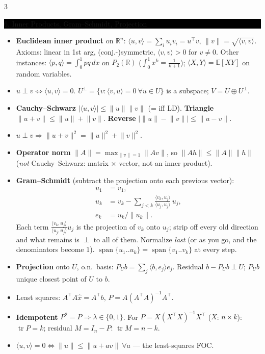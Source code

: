 \documentclass[8pt,letterpaper]{article}
\makeatletter
\newcommand{\sect}[1]{%
  \vspace{2.2pt}%
  \noindent\colorbox{black}{\parbox{\dimexpr\linewidth-2\fboxsep}{%
    \color{white}\bfseries\scshape\fontsize{6.4}{7.4}\selectfont
    \hyphenpenalty=10000\exhyphenpenalty=10000\raggedright #1}}%
  \vspace{1.4pt}\par\nopagebreak\@afterheading}
\newenvironment{tl}
  {\begin{itemize}[leftmargin=6pt,itemsep=0.3pt,topsep=1pt,parsep=0pt,
                   partopsep=0pt,label=\textcolor{gray}{\tiny$\bullet$}]}
  {\end{itemize}}
\newcommand{\R}{\mathbb{R}}
\newcommand{\Rn}{\mathbb{R}^n}
\newcommand{\E}{\mathbb{E}}
\newcommand{\tr}{\operatorname{tr}}
\newcommand{\spn}{\operatorname{span}}
\newcommand{\tp}{^{\!\top}}
\newcommand{\ip}[2]{\langle #1,#2\rangle}
\newcommand{\nm}[1]{\lVert #1\rVert}
\makeatother
\begin{document}
\begin{multicols}{3}
\sect{6. Inner Products, Gram--Schmidt, Projection}
\begin{tl}
\item \textbf{Euclidean inner product} on $\Rn$: $\ip{u}{v}=\sum_i u_iv_i=u\tp v$, $\nm{v}=\sqrt{\ip{v}{v}}$. Axioms: linear in 1st arg, (conj.-)symmetric, $\ip{v}{v}>0$ for $v\neq0$. Other instances: $\ip{p}{q}=\int_0^1pq\,dx$ on $P_2(\R)$ ($\int_0^1x^k=\frac1{k+1}$); $\ip{X}{Y}=\E[XY]$ on random variables.
\item $u\perp v\iff\ip{u}{v}=0$. $U^\perp=\{v:\ip{v}{u}=0\ \forall u\in U\}$ is a subspace; $V=U\oplus U^\perp$.
\item \textbf{Cauchy--Schwarz} $|\ip{u}{v}|\le\nm{u}\nm{v}$ (= iff LD). \textbf{Triangle} $\nm{u+v}\le\nm{u}+\nm{v}$. \textbf{Reverse} $\big|\nm{u}-\nm{v}\big|\le\nm{u-v}$.
\item $u\perp v\Rightarrow\nm{u+v}^2=\nm{u}^2+\nm{v}^2$.
\item \textbf{Operator norm} $\nm{A}=\max_{\nm{v}=1}\nm{Av}$, so $\nm{Ah}\le\nm{A}\nm{h}$ (\emph{not} Cauchy--Schwarz: matrix $\times$ vector, not an inner product).
\item \textbf{Gram--Schmidt} (subtract the projection onto each previous vector):
\begin{align*}
u_1&=v_1,\\
u_k&=v_k-\sum_{j<k}\frac{\ip{v_k}{u_j}}{\ip{u_j}{u_j}}\,u_j,\\
e_k&=u_k/\nm{u_k}.
\end{align*}
Each term $\frac{\ip{v_k}{u_j}}{\ip{u_j}{u_j}}u_j$ is the projection of $v_k$ onto $u_j$; strip off every old direction and what remains is $\perp$ to all of them. Normalize \emph{last} (or as you go, and the denominators become $1$). $\spn\{u_1..u_k\}=\spn\{v_1..v_k\}$ at every step.
\item \textbf{Projection} onto $U$, o.n.\ basis: $P_Ub=\sum_j\ip{b}{e_j}e_j$. Residual $b-P_Ub\perp U$; $P_Ub$ unique closest point of $U$ to $b$.
\item Least squares: $A\tp A\hat x=A\tp b$, $P=A(A\tp A)^{-1}A\tp$.
\item \textbf{Idempotent} $P^2=P\Rightarrow\lambda\in\{0,1\}$. For $P=X(X\tp X)^{-1}X\tp$ ($X$: $n\times k$): $\tr P=k$; residual $M=I_n-P$: $\tr M=n-k$.
\item \textbf{$\ip{u}{v}=0\iff\nm{u}\le\nm{u+av}\ \forall a$} --- the least-squares FOC.
\end{tl}


\end{multicols}
\end{document}
